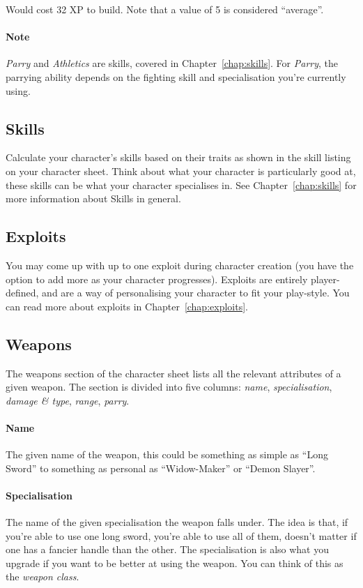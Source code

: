 Would cost 32 XP to build.
Note that a value of 5 is considered ``average''.

\paragraph{Note} \textit{Parry} and \textit{Athletics} are skills, covered in Chapter~\ref{chap:skills}.
For \textit{Parry}, the parrying ability depends on the fighting skill and specialisation you're currently using.

\subsection{Skills}
Calculate your character's skills based on their traits as shown in the skill listing on your character sheet.
Think about what your character is particularly good at, these skills can be what your character specialises in.
See Chapter~\ref{chap:skills} for more information about Skills in general.

\subsection{Exploits}
You may come up with up to one exploit during character creation (you have the option to add more as your character progresses).
Exploits are entirely player-defined, and are a way of personalising your character to fit your play-style.
You can read more about exploits in Chapter~\ref{chap:exploits}.

\subsection{Weapons}
The weapons section of the character sheet lists all the relevant attributes of a given weapon.
The section is divided into five columns: \textit{name}, \textit{specialisation}, \textit{damage \& type}, \textit{range}, \textit{parry}.

\paragraph{Name} The given name of the weapon, this could be something as simple as ``Long Sword'' to something as personal as ``Widow-Maker'' or ``Demon Slayer''.

\paragraph{Specialisation} The name of the given specialisation the weapon falls under.
The idea is that, if you're able to use one long sword, you're able to use all of them, doesn't matter if one has a fancier handle than the other. 
The specialisation is also what you upgrade if you want to be better at using the weapon.
You can think of this as the \textit{weapon class}.

